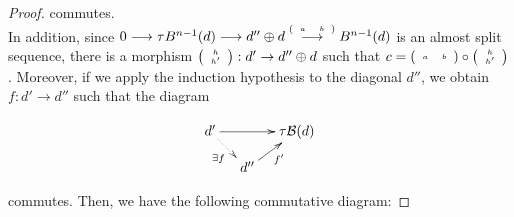 \documentclass{amsart}
\theoremstyle{plain}
\theoremstyle{definition}
\begin{document}
\begin{proof}
commutes.\\
In addition, since  $0\longrightarrow \tau B^{n-1}(d) \longrightarrow d''\oplus d\stackrel{\tiny{\left(
                                                  \begin{array}{cc}
                                                    a & b \\
                                                  \end{array}
                                                \right)
}} {\longrightarrow} B^{n-1}(d)$  is an almost split sequence,  there is a  morphism $\tiny{\left(
                 \begin{array}{c}
                   h \\
                   h' \\
                 \end{array}
               \right)
}:d'\rightarrow d''\oplus d$ such that  $c=\tiny{\left(
                                                  \begin{array}{cc}
                                                    a & b \\
                                                  \end{array}
                                                \right)
} \circ \tiny{\left(
                 \begin{array}{c}
                   h \\
                   h' \\
                 \end{array}
               \right)
}$. Moreover, if we apply the induction hypothesis to the diagonal  $d''$, we obtain   $f:d'\rightarrow d''$
 such that the diagram

  $$\xymatrix@R=.4cm@C=.4cm{d' \ar[rr] \ar@{.>}[dr]_{\exists f  }&& \tau \mathcal{B}(d) \\
& d'' \ar[ru]_{f'}&}$$

commutes. Then, we have the following commutative diagram:


\end{proof}
\end{document}
